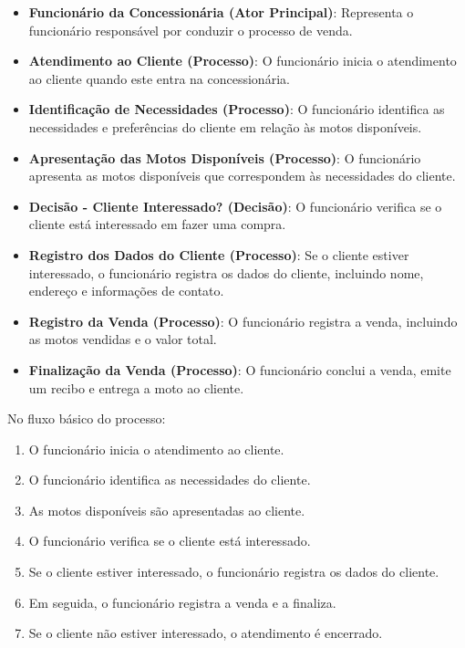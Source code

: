 \begin{itemize}
	\item \textbf{Funcionário da Concessionária (Ator Principal)}: Representa o funcionário responsável por conduzir o processo de venda.
	
	\item \textbf{Atendimento ao Cliente (Processo)}: O funcionário inicia o atendimento ao cliente quando este entra na concessionária.
	
	\item \textbf{Identificação de Necessidades (Processo)}: O funcionário identifica as necessidades e preferências do cliente em relação às motos disponíveis.
	
	\item \textbf{Apresentação das Motos Disponíveis (Processo)}: O funcionário apresenta as motos disponíveis que correspondem às necessidades do cliente.
	
	\item \textbf{Decisão - Cliente Interessado? (Decisão)}: O funcionário verifica se o cliente está interessado em fazer uma compra.
	
	\item \textbf{Registro dos Dados do Cliente (Processo)}: Se o cliente estiver interessado, o funcionário registra os dados do cliente, incluindo nome, endereço e informações de contato.
	
	\item \textbf{Registro da Venda (Processo)}: O funcionário registra a venda, incluindo as motos vendidas e o valor total.
	
	\item \textbf{Finalização da Venda (Processo)}: O funcionário conclui a venda, emite um recibo e entrega a moto ao cliente.
\end{itemize}

No fluxo básico do processo:

\begin{enumerate}
	\item O funcionário inicia o atendimento ao cliente.
	\item O funcionário identifica as necessidades do cliente.
	\item As motos disponíveis são apresentadas ao cliente.
	\item O funcionário verifica se o cliente está interessado.
	\item Se o cliente estiver interessado, o funcionário registra os dados do cliente.
	\item Em seguida, o funcionário registra a venda e a finaliza.
	\item Se o cliente não estiver interessado, o atendimento é encerrado.
\end{enumerate}


